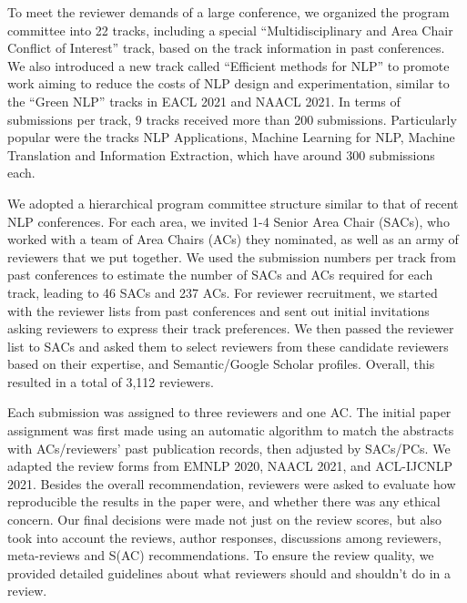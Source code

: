 To meet the reviewer demands of a large conference, we organized the program committee into 22 tracks, including a special ``Multidisciplinary and Area Chair Conflict of Interest'' track, based on the track information in past conferences. We also introduced a new track called ``Efficient methods for NLP'' to promote work aiming to reduce the costs of NLP design and experimentation, similar to the ``Green NLP'' tracks in EACL 2021 and NAACL 2021. In terms of submissions per track, 9 tracks received more than 200 submissions. Particularly popular were the tracks NLP Applications, Machine Learning for NLP, Machine Translation and Information Extraction, which have around 300 submissions each.

We adopted a hierarchical program committee structure similar to that of recent NLP conferences. For each area, we invited 1-4 Senior Area Chair (SACs), who worked with a team of Area Chairs (ACs) they nominated, as well as an army of reviewers that we put together. We used the submission numbers per track from past conferences to estimate the number of SACs and ACs required for each track, leading to 46 SACs and 237 ACs. For reviewer recruitment, we started with the reviewer lists from past conferences and sent out initial invitations asking reviewers to express their track preferences. We then passed the reviewer list to SACs and asked them to select reviewers from these candidate reviewers based on their expertise, and Semantic/Google Scholar profiles. Overall, this resulted in a total of 3,112 reviewers.

Each submission was assigned to three reviewers and one AC. The initial paper assignment was first made using an automatic algorithm to match the abstracts with ACs/reviewers' past publication records, then adjusted by SACs/PCs. We adapted the review forms from EMNLP 2020, NAACL 2021, and ACL-IJCNLP 2021. Besides the overall recommendation, reviewers were asked to evaluate how reproducible the results in the paper were, and whether there was any ethical concern. Our final decisions were made not just on the review scores, but also took into account the reviews, author responses, discussions among reviewers, meta-reviews and S(AC) recommendations. To ensure the review quality, we provided detailed guidelines about what reviewers should and shouldn't do in a review.

